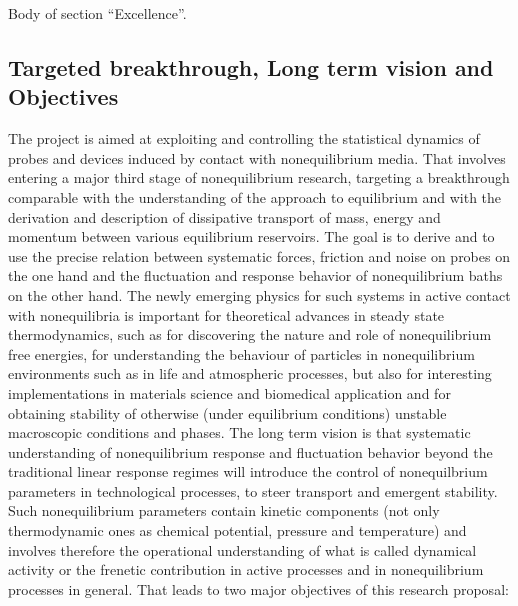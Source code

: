 
Body of section ``Excellence''.

\subsection{Targeted breakthrough, Long term vision and Objectives}\label{sec:objectives}

The project is aimed at exploiting and controlling the statistical dynamics of probes and devices induced by contact with nonequilibrium media.  That involves entering a major third stage of nonequilibrium research, targeting a breakthrough comparable with the understanding of the approach to equilibrium and with the derivation and description of dissipative transport of mass, energy and momentum between various equilibrium reservoirs.  The goal is to derive and to use the precise relation between systematic forces, friction and noise on probes on the one hand and the fluctuation and response behavior of nonequilibrium baths on the other hand.  The newly emerging physics for such systems in active contact with nonequilibria is important for theoretical advances in steady state thermodynamics, such as for discovering the nature and role of nonequilibrium free energies, for understanding the behaviour of particles in nonequilibrium environments such as in life and atmospheric processes, but also for interesting implementations in materials science and biomedical application and for obtaining stability of otherwise (under equilibrium conditions) unstable macroscopic conditions and phases. The long term vision is that systematic understanding of nonequilibrium response and fluctuation behavior beyond the traditional linear response regimes will introduce the control of nonequilbrium parameters in technological processes, to steer transport and emergent stability.  Such nonequilibrium parameters contain kinetic components (not only thermodynamic ones as chemical potential, pressure and temperature) and involves therefore the operational understanding of what is called dynamical activity or the frenetic contribution in active processes and in nonequilibrium processes in general. That leads to two major objectives of this research proposal:\\
